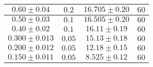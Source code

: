 \documentclass[../main.tex]{subfiles}
\begin{document}
\begin{tabular}{ ||c|c|c|c|| }
        \hline
        $0.60\pm 0.04$      & $0.2$       & $16.705\pm 0.20$  & $60$     \\
        \hline
        $0.50\pm 0.03$      & $0.1$       & $16.505\pm 0.20$  & $60$     \\
        \hline
        $0.40\pm 0.02$      & $0.1$       & $16.11\pm 0.19$   & $60$     \\
        \hline
        $0.300\pm 0.013$      & $0.05$       & $15.13\pm 0.18$   & $60$     \\
        \hline
        $0.200\pm 0.012$      & $0.05$       & $12.18\pm 0.15$   & $60$     \\
        \hline
        $0.150\pm 0.011$     & $0.05$       & $8.525\pm 0.12$   & $60$     \\
        \hline

    \end{tabular}
\end{document}
